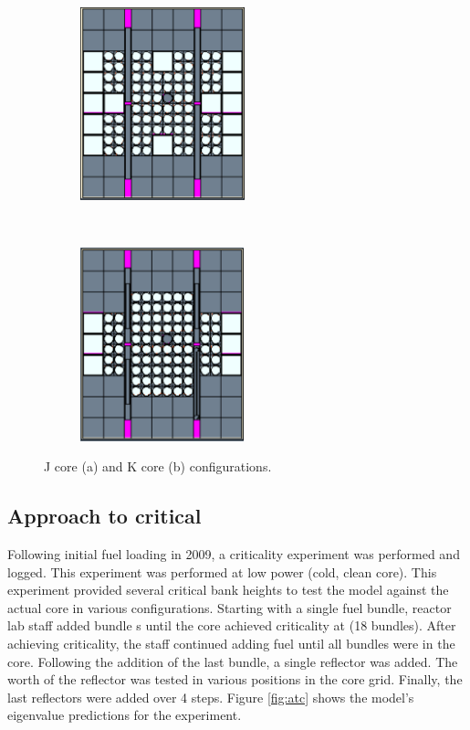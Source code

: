 \documentclass{UWNR_modeling}
\begin{document}
\begin{figure}[h]
    \centering
    \begin{subfigure}[t]{0.5\textwidth}
        \centering
        \includegraphics[height=2.2in]{jcore.pdf}
        \caption{}
    \end{subfigure}%
    ~ 
    \begin{subfigure}[t]{0.5\textwidth}
        \centering
        \includegraphics[height=2.2in]{kcore.pdf}
        \caption{}
    \end{subfigure}
    \caption{J core (a) and K core (b) configurations.}
    \label{fig:core_configurations}
\end{figure}
\subsection{Approach to critical}
Following initial fuel loading in 2009, a criticality experiment was performed and logged. This experiment was performed at low power (cold, clean core). This experiment provided several critical bank heights to test the model against the actual core in various configurations. Starting with a single fuel bundle, reactor lab staff added bundle
s until the core achieved criticality at (18 bundles). After achieving criticality, the staff continued adding fuel until all bundles were in the core. Following the addition of the last bundle, a single reflector was added. The worth of the reflector was tested in various positions in the core grid. Finally, the last reflectors were added over 4 steps.  Figure \ref{fig:atc} shows the model's eigenvalue predictions for the experiment.
\end{document}
